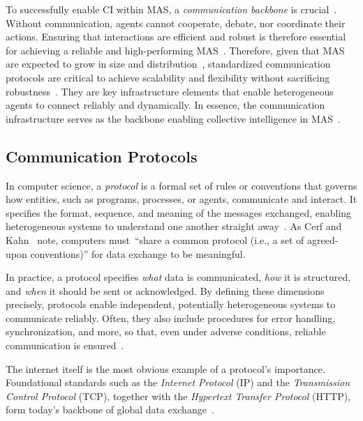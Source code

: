 \documentclass[pdflatex,sn-mathphys-num]{sn-jnl}%
\theoremstyle{thmstyleone}%
\theoremstyle{thmstyletwo}%
\theoremstyle{thmstylethree}%
\begin{document}
To successfully enable CI within MAS, a \textit{communication backbone} is crucial~\cite{guo2024large}. Without communication, agents cannot cooperate, debate, nor coordinate their actions. Ensuring that interactions are efficient and robust is therefore essential for achieving a reliable and high-performing MAS~\cite{han2024llm,yan2025beyond}. Therefore, given that MAS are expected to grow in size and distribution~\cite{wang2025internet,li2024more}, standardized communication protocols are critical to achieve scalability and flexibility without sacrificing robustness~\cite{ehtesham2025survey,kong2025survey}. They are key infrastructure elements that enable heterogeneous agents to connect reliably and dynamically. In essence, the communication infrastructure serves as the backbone enabling collective intelligence in MAS~\cite{marro2024scalable,yan2025beyond,guo2024large,cemri2025multi}.

\subsection{Communication Protocols}
\label{sec:communication-protocols}

In computer science, a \textit{protocol} is a formal set of rules or conventions that governs how entities, such as programs, processes, or agents, communicate and interact. It specifies the format, sequence, and meaning of the messages exchanged, enabling heterogeneous systems to understand one another straight away~\cite{pouzin2005tutorial,tanenbaum2011computer}. As Cerf and Kahn~\cite{cerf1974protocol} note, computers must~\enquote{share a common protocol (i.e., a set of agreed-upon conventions)} for data exchange to be meaningful.

In practice, a protocol specifies \textit{what} data is communicated, \textit{how} it is structured, and \textit{when} it should be sent or acknowledged. By defining these dimensions precisely, protocols enable independent, potentially heterogeneous systems to communicate reliably. Often, they also include procedures for error handling, synchronization, and more, so that, even under adverse conditions, reliable communication is ensured~\cite{pouzin2005tutorial,tanenbaum2011computer}.

The internet itself is the most obvious example of a protocol's importance. Foundational standards such as the \textit{Internet Protocol} (IP) and the \textit{Transmission Control Protocol} (TCP), together with the \textit{Hypertext Transfer Protocol} (HTTP), form today's backbone of global data exchange~\cite{nath2015tcp,cerf1974protocol}.
\end{document}
